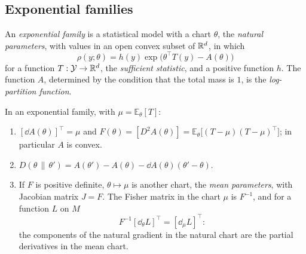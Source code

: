 \begin{notechapter}
\subsection*{Exponential families}

\begin{definition}\label{natural-gradient:def:expfam}
An \emph{exponential family} is a statistical model with a chart
$\theta$, the \emph{natural parameters}, with values in an open convex
subset of $\mathbb{R}^d$, in which
\[
  \rho(y; \theta)
  = h(y)\exp\bigl(\theta^\top T(y) - A(\theta)\bigr)
\]
for a function $T:\mathcal Y\to\mathbb{R}^d$, the \emph{sufficient statistic},
and a positive function $h$. The function $A$, determined by the
condition that the total mass is $1$, is the \emph{log-partition
function}.
\end{definition}

\begin{theorem}\label{natural-gradient:thm:expfam}
In an exponential family, with $\mu = \mathbb E_\theta[T]$:
\begin{enumerate}[nosep]
  \item $[\dd A(\theta)]^\top = \mu$ and
        $F(\theta) = [D^2A(\theta)]
        = \mathbb E_\theta\bigl[(T - \mu)(T - \mu)^\top\bigr]$; in
        particular $A$ is convex.
  \item $D(\theta\,\|\,\theta')
        = A(\theta') - A(\theta) - \dd A(\theta)(\theta' - \theta)$.
  \item If $F$ is positive definite, $\theta\mapsto\mu$ is another chart,
        the \emph{mean parameters}, with Jacobian matrix $J = F$. The
        Fisher matrix in the chart $\mu$ is $F^{-1}$, and for a function
        $L$ on $M$
        \[
          F^{-1}[\dd_\theta L]^\top = [\dd_\mu L]^\top :
        \]
        the components of the natural gradient in the natural chart are
        the partial derivatives in the mean chart.
\end{enumerate}
\end{theorem}


\end{notechapter}
